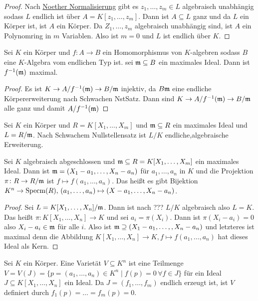 \begin{proof}
    Nach \hyperref[Satz:NoetherNor]{Noether Normalisierung} gibt es \(z_1,\dots,z_m\in L\) algebraisch unabhängig sodass \(L\) endlich ist über \(A=K[z_1,\dots,z_m]\).
    Dann ist \(A\subseteq L\) ganz und da \(L\) ein Körper ist, ist \(A\) ein Körper.
    Da \(Z_1,\dots,z_m\) algebraisch unabhängig sind, ist \(A\) ein Polynomring in \(m\) Variablen. Also ist \(m=0\) und \(L\) ist endlich über \(K\).
\end{proof}
\begin{Kor}
    Sei \(K\) ein Körper und \(f\colon A\to B\) ein Homomorphismus von \(K\)-algebren sodass \(B\) eine \(K\)-Algebra vom endlichen Typ ist. sei \(\mathfrak{m}\subseteq B\) ein maximales Ideal. Dann ist \(f^{-1}(\mathfrak{m})\) maximal.
\end{Kor}
\begin{proof}
    Es ist \(K\to A/f^{-1}(\mathfrak{m})\to B/\mathfrak{m}\) injektiv, da \(B\mathfrak{m}\) eine endliche Körpererweiterung nach Schwachen NstSatz. Dann sind \(K\to A/f^{-1}(\mathfrak{m})\to B/\mathfrak{m}\) alle ganz und damit \(A/f^{-1}(\mathfrak{m})\) %
\end{proof}
\begin{Bsp}
    Sei \(K\) ein Körper und \(R=K[X_1,\dots,X_m]\) und \(\mathfrak{m}\subseteq R\) ein maximales Ideal und \(L=R/\mathfrak{m}\).
    Nach Schwachem Nullstellensatz ist \(L/K\) endliche,algebraische Erweiterung.
    
\end{Bsp}
\begin{Kor}
    Sei \(K\) algebraisch abgeschlossen und \(\mathfrak{m}\subseteq R=K[X_1,\dots,X_m]\) ein maximales Ideal. Dann ist \(\mathfrak{m}=(X_1-a_1,\dots,X_n-a_n)\) für \(a_1,\dots,a_n\) in \(K\) und die Projektion \(\pi\colon R\to R/\mathfrak{m}\) ist \(f\mapsto f(a_1,\dots,a_n)\).
    Das heißt es gibt Bijektion \(K^n\to \operatorname{Specm}(R),\, (a_1,\dots,a_n)\mapsto (X-a_1,\dots,X_n-a_n)\).
\end{Kor}
\begin{proof}
    Sei \(L=K[X_1,\dots,X_n]/\mathfrak{m}\). Dann ist nach ??? \(L/K\) algebraisch also \(L=K\).
    Das heißt \(\pi\colon K[X_1,\dots,X_n]\to K\) und sei \(a_i=\pi(X_i)\).
    Dann ist \(\pi(X_i-a_i)=0\) also \(X_i-a_i\in\mathfrak{m}\) für alle \(i\).
    Also ist \(\mathfrak{m}\supseteq (X_1-a_1,\dots,,X_n-a_n)\) und letzteres ist maximal denn die Abbildung \(K[X_1,\dots,X_n]\to K, f\mapsto f(a_1,\dots,a_n)\) hat dieses Ideal als Kern.
\end{proof}
\begin{Def}
    Sei \(K\) ein Körper. Eine Varietät \(V\subseteq K^n\) ist eine Teilmenge \(V=V(J)=\{p=(a_1,\dots,a_n)\in K^n\mid f(p)=0\, \forall f\in J\}\)  für ein Ideal \(J\subseteq K[X_1,\dots,X_n]\) ein Ideal. Da \(J=(f_1,\dots,f_m)\) endlich erzeugt ist, ist \(V\) definiert durch \(f_1(p)=\dots=f_m(p)=0\).
\end{Def}
